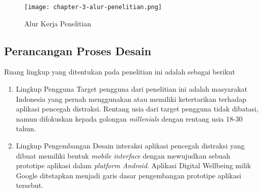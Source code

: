 \begin{figure}[h]
  \centering
  \texttt{[image: chapter-3-alur-penelitian.png]}
  \caption{Alur Kerja Penelitian}
  \label{fig:diagram_alur_kerja}
\end{figure}

\subsection{Perancangan Proses Desain}
Ruang lingkup yang ditentukan pada penelitian ini adalah sebagai berikut

\begin{enumerate}
  \item Lingkup Pengguna
  \subitem Target pengguna dari penelitian ini adalah masyarakat Indonesia yang pernah menggunakan atau memiliki ketertarikan terhadap aplikasi pencegah distraksi. Rentang usia dari target pengguna tidak dibatasi, namun difokuskan kepada golongan \textit{millenials} dengan rentang usia 18-30 tahun.
  \item Lingkup Pengembangan
  \subitem Desain interaksi aplikasi pencegah distraksi yang dibuat memiliki bentuk \textit{mobile interface} dengan mewujudkan sebuah prototipe aplikasi dalam \textit{platform Android}. Aplikasi Digital Wellbeing milik Google ditetapkan menjadi garis dasar pengembangan prototipe aplikasi tersebut.
\end{enumerate}












